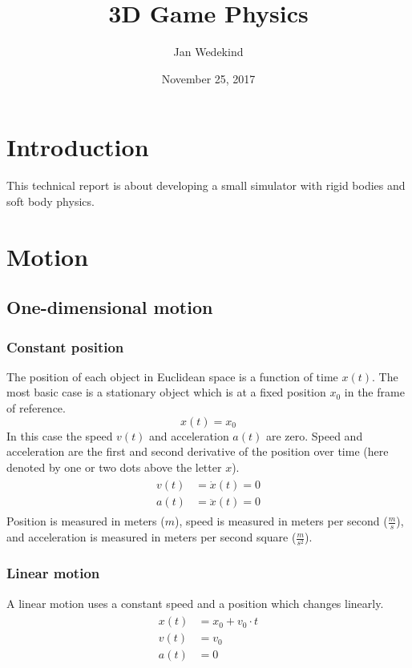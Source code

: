 \documentclass[12pt,a4paper,twoside]{article}
\title{3D Game Physics}
\author{Jan Wedekind}
\date{November 25, 2017}
\begin{document}
\maketitle

\section{Introduction}
This technical report is about developing a small simulator with rigid bodies and soft body physics.

\section{Motion}
\subsection{One-dimensional motion}
\subsubsection{Constant position}
The position of each object in Euclidean space is a function of time $x(t)$.
The most basic case is a stationary object which is at a fixed position $x_0$ in the frame of reference.
\begin{equation*}
  x(t) = x_0
\end{equation*}
In this case the speed $v(t)$ and acceleration $a(t)$ are zero.
Speed and acceleration are the first and second derivative of the position over time (here denoted by one or two dots above the letter $x$).
\begin{align*}
  \begin{split}
    v(t) & = \dot{x}(t)  = 0\\
    a(t) & = \ddot{x}(t) = 0
  \end{split}
\end{align*}
Position is measured in meters ($m$), speed is measured in meters per second ($\frac{m}{s}$), and acceleration is measured in meters per second square ($\frac{m}{s^2}$).

\subsubsection{Linear motion}
A linear motion uses a constant speed and a position which changes linearly.
\begin{align*}
  \begin{split}
    x(t) & = x_0 + v_0 \cdot t\\
    v(t) & = v_0\\
    a(t) & = 0
  \end{split}
\end{align*}
\end{document}
